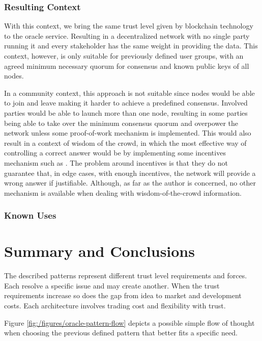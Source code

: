 \subsubsection{Resulting Context}
With this context, we bring the same trust level given by blockchain technology to the oracle service. Resulting in a decentralized network with no single party running it and every stakeholder has the same weight in providing the data. This context, however, is only suitable for previously defined user groups, with an agreed minimum necessary quorum for consensus and known public keys of all nodes.

In a community context, this approach is not suitable since nodes would be able to join and leave making it harder to achieve a predefined consensus. Involved parties would be able to launch more than one node, resulting in some parties being able to take over the minimum consensus quorum and overpower the network unless some proof-of-work mechanism is implemented. This would also result in a context of wisdom of the crowd, in which the most effective way of controlling a correct answer would be by implementing some incentives mechanism such as \cite{Adler2018a}. The problem around incentives is that they do not guarantee that, in edge cases, with enough incentives, the network will provide a wrong answer if justifiable. Although, as far as the author is concerned, no other mechanism is available when dealing with wisdom-of-the-crowd information.



\subsubsection{Known Uses}


\section{Summary and Conclusions}

The described patterns represent different trust level requirements and forces. Each resolve a specific issue and may create another. When the trust requirements increase so does the gap from idea to market and development costs. Each architecture involves trading cost and flexibility with trust. 

Figure \ref{fig:/figures/oracle-pattern-flow} depicts a possible simple flow of thought when choosing the previous defined pattern that better fits a specific need.


